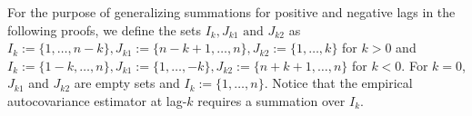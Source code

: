 \documentclass[11pt]{article}
\theoremstyle{remark}
\begin{document}



For the purpose of generalizing summations for positive and negative lags in the following proofs, we define the sets $I_k, J_{k1} \text{ and } J_{k2}$ as $ I_k := \{1, \dots, n-k\}, J_{k1} := \{n-k+1, \dots , n\}, J_{k2} := \{1, \dots, k\}$ for $k > 0$ and  $I_k := \{1-k, \dots, n\}, J_{k1} := \{1, \dots , -k\}, J_{k2} := \{n+k+1, \dots, n\}$ for $k < 0$. For $k=0$, $J_{k1}$ and $J_{k2}$ are empty sets and $I_k := \{1, \dots, n\}$. Notice that the empirical autocovariance estimator at lag-$k$ requires a summation over $I_k$. 
\end{document}
